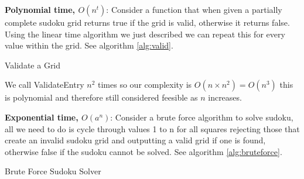 \documentclass[a4paper,11pt]{report}
\begin{document}
\textbf{Polynomial time, $O(n^t)$}: Consider a function that when given a partially complete sudoku grid returns true if the grid is valid, otherwise it returns false. Using the linear time algorithm we just described we can repeat this for every value within the grid. See algorithm \ref{alg:valid}.

\begin{algorithm}
\caption{Validate a Grid}\label{alg:valid}
\begin{algorithmic}
	 
			\EndIf
		\EndFor
	\EndFor
\EndProcedure
\end{algorithmic}
\end{algorithm}

We call ValidateEntry $n^2$ times so our complexity is $O(n\times n^2) = O(n^3)$ this is polynomial and therefore still considered feesible as $n$ increases. 
 
\textbf{Exponential time, $O(a^n)$}: Consider a brute force algorithm to solve sudoku, all we need to do is cycle through values 1 to n for all squares rejecting those that create an invalid sudoku grid and outputting a valid grid if one is found, otherwise false if the sudoku cannot be solved. See algorithm \ref{alg:bruteforce}.

\begin{algorithm}
\caption{Brute Force Sudoku Solver} \label{alg:bruteforce}
\begin{algorithmic}
		\Else
		\EndIf
	\EndIf
		\EndIf
	\EndFor
\EndProcedure
\end{algorithmic}
\end{algorithm}
\end{document}
